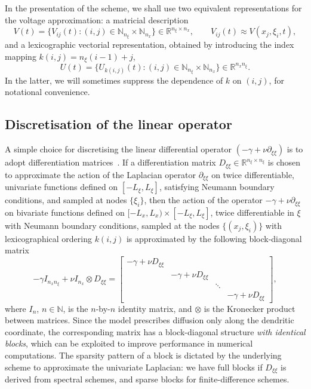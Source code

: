 \documentclass[a4paper,final]{siamart190516}
\newcommand{\Rb}{\mathbb{R}}
\newcommand{\Nb}{\mathbb{N}}
\begin{document}
In the presentation of the scheme, we shall use two equivalent representations for
the voltage approximation: a matricial description 
\begin{equation}\label{eq:VMatrix}
  V(t) = \{ V_{ij}(t) 
  \colon (i,j) \in \Nb_{n_\xi} \times \Nb_{n_x} \} 
    \in \Rb^{n_\xi \times n_x}, \qquad V_{ij}(t) \approx
  V(x_j,\xi_i,t), 
\end{equation}
and a lexicographic vectorial representation, obtained by introducing the
index mapping $k(i,j) = n_\xi(i-1) + j$,
\begin{equation}\label{eq:VVector}
  U(t) = \{ U_{k(i,j)}(t) \colon (i,j) \in \Nb_{n_\xi} \times \Nb_{n_x} \} 
  \in \Rb^{n_x n_\xi}.
\end{equation}
In the latter, we will sometimes suppress the dependence of $k$ on $(i,j)$, for
notational convenience.

\subsection{Discretisation of the linear operator} A simple choice for discretising
the linear differential operator $(-\gamma + \nu \partial_{\xi \xi})$ is to adopt
differentiation matrices~\cite{trefethen2000}. If a differentiation matrix
$D_{\xi \xi} \in \Rb^{n_\xi \times n_\xi}$ is chosen to approximate the action of
the Laplacian operator $\partial_{\xi \xi}$ on twice differentiable, univariate
functions defined on $[-L_\xi,L_\xi]$, satisfying Neumann boundary conditions, and
sampled at nodes $\{ \xi_i \}$, then the action of the operator $-\gamma + \nu
\partial_{\xi\xi}$ on bivariate functions defined on $[-L_x,L_x) \times
[-L_\xi,L_\xi]$, twice differentiable in $\xi$ with Neumann boundary conditions,
sampled at the nodes $\{ (x_j,\xi_i) \}$ with lexicographical ordering $k(i,j)$ is
approximated by the following block-diagonal matrix
\begin{equation*}\label{eq:LinOp}
  -\gamma I_{n_x n_\xi} + \nu I_{n_x} \otimes D_{\xi \xi} = 
  \begin{bmatrix}
    -\gamma + \nu D_{\xi \xi} &                          &        &               \\
                             &-\gamma + \nu D_{\xi \xi} &        &               \\
                             &                          & \ddots &               \\
                             &                          &        &-\gamma + \nu D_{\xi \xi}     \end{bmatrix}
  ,
\end{equation*}
where $I_n$, $n \in \Nb$, is the $n$-by-$n$ identity matrix, and $\otimes$ is the
Kronecker product between matrices. Since the model prescribes diffusion only along
the dendritic coordinate, the
corresponding matrix has a block-diagonal structure \emph{with identical blocks},
which can be exploited to improve performance in numerical computations. The sparsity pattern of a block is dictated by the
underlying scheme to approximate the univariate Laplacian: we have full blocks if
$D_{\xi\xi}$ is derived from spectral schemes, and sparse blocks
for finite-difference schemes. 
\end{document}
